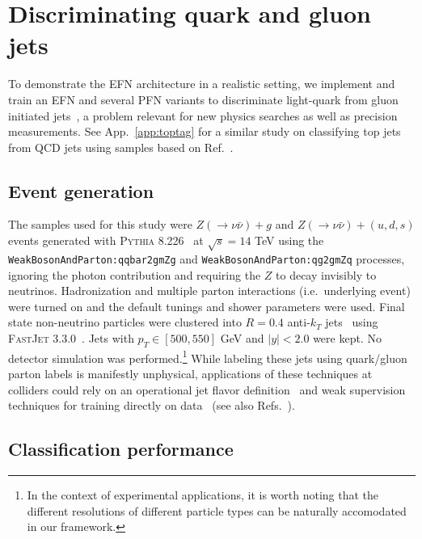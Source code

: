 \documentclass[letterpaper,11pt]{article}
\DeclareRobustCommand{\App}[1]{App.~\ref{#1}}
\DeclareRobustCommand{\Ref}[1]{Ref.~\cite{#1}}
\DeclareRobustCommand{\Refs}[1]{Refs.~\cite{#1}}
\newcommand{\pythia}{\textsc{Pythia}\xspace}
\begin{document}
\section{Discriminating quark and gluon jets}
\label{sec:qg}


To demonstrate the EFN architecture in a realistic setting, we implement and train an EFN and several PFN variants to discriminate light-quark from gluon initiated jets~\cite{Gallicchio:2011xq,Gallicchio:2012ez,Aad:2014gea,Gras:2017jty}, a problem relevant for new physics searches as well as precision measurements.
%
See \App{app:toptag} for a similar study on classifying top jets from QCD jets using samples based on \Ref{Butter:2017cot}.


\subsection{Event generation}
\label{sec:eventgen}


The samples used for this study were $Z(\to\nu\bar\nu)+g$ and $Z(\to\nu\bar\nu)+(u,d,s)$ events generated with \pythia 8.226~\cite{Sjostrand:2006za,Sjostrand:2014zea} at $\sqrt{s}=14$ TeV using the {\tt WeakBosonAndParton:qqbar2gmZg} and {\tt WeakBosonAndParton:qg2gmZq} processes, ignoring the photon contribution and requiring the $Z$ to decay invisibly to neutrinos.
%
Hadronization and multiple parton interactions (i.e.\ underlying event) were turned on and the default tunings and shower parameters were used.
%
Final state non-neutrino particles were clustered into $R=0.4$ anti-$k_T$ jets~\cite{Cacciari:2008gp} using \textsc{FastJet} 3.3.0~\cite{Cacciari:2011ma}.
%
Jets with $p_T\in[500,550]$ GeV and $|y|<2.0$ were kept.
%
No detector simulation was performed.\footnote{In the context of experimental applications, it is worth noting that the different resolutions of different particle types can be naturally accomodated in our framework.}
%
While labeling these jets using quark/gluon parton labels is manifestly unphysical, applications of these techniques at colliders could rely on an operational jet flavor definition~\cite{Komiske:2018vkc} and weak supervision techniques for training directly on data~\cite{Metodiev:2017vrx,Komiske:2018oaa} (see also \Refs{Dery:2017fap,Cohen:2017exh,blanchard2016classification,blanchard2018corrigendum,Metodiev:2018ftz}).


\subsection{Classification performance}
\label{sec:performance}
\end{document}
